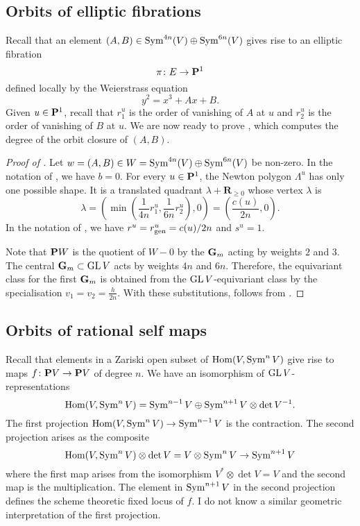 \documentclass{amsart}
\begin{document}
\subsection{Orbits of elliptic fibrations}\label{sec:ellipticfibrations}
Recall that an element \((A,B) \in \Sym^{4n}(V) \oplus \Sym^{6n}(V)\) gives rise to an elliptic fibration
\[ \pi \colon E \to \P^1\]
defined locally by the Weierstrass equation
\[ y^2 = x^3 + Ax + B.\]
Given \(u \in \P^{1}\), recall that \(r_1^u\) is the order of vanishing of \(A\) at \(u\) and \(r_2^u\) is the order of vanishing of \(B\) at \(u\).
We are now ready to prove , which computes the degree of the orbit closure of \((A,B)\).
\begin{proof}[Proof of ]
  Let \(w = (A,B) \in W = \Sym^{4n}(V) \oplus \Sym^{6n}(V)\) be non-zero.
  In the notation of , we have \(b = 0\).
  For every \(u \in \P^1\), the Newton polygon \(\Lambda^u\) has only one possible shape.
  It is a translated quadrant \(\lambda + \mathbf{R}_{\geq 0}\) whose vertex \(\lambda\) is
  \[ \lambda = \left(\min\left(\frac{1}{4n}r_1^u, \frac{1}{6n}r_2^u\right), 0\right) = \left(\frac{c(u)}{2n},0\right).\]
  In the notation of , we have \(r^u = r_{\rm gen}^u = c(u)/2n\) and \(s^u = 1\).

  Note that \(\P W\) is the quotient of  \(W - 0\) by the \(\Gm\) acting by weights \(2\) and \(3\).
The central \(\Gm \subset \GL V\) acts by weights \(4n\) and \(6n\).
Therefore, the equivariant class for the first \(\Gm\) is obtained from the \(\GL V\)-equivariant class by the specialisation \(v_1 = v_2 = \frac{h}{2n}\).
With these substitutions,  follows from .
\end{proof}


\subsection{Orbits of rational self maps}\label{sec:ratmaps}
Recall that elements in a Zariski open subset of \(\Hom(V, \Sym^nV)\) give rise to maps \(f \colon \P V \to \P V\) of degree \(n\).
We have an isomorphism of \(\GL V\)-representations
\begin{equation}\label{eqn:splitting}
  \Hom(V, \Sym^n V) = \Sym^{n-1} V \oplus \Sym^{n+1} V \otimes \det V^{-1}.
\end{equation}
The first projection \(\Hom(V, \Sym^nV) \to \Sym^{n-1} V\) is the contraction.
The second projection arises as the composite
\[\Hom(V, \Sym^nV) \otimes \det V = V \otimes \Sym^nV \to \Sym^{n+1}V\]
where the first map arises from the isomorphism \(V^{*} \otimes \det V = V\) and the second map is the multiplication.
The element in \(\Sym^{n+1}V\) in the second projection defines the scheme theoretic fixed locus of \(f\).
I do not know a similar geometric interpretation of the first projection.
\end{document}
